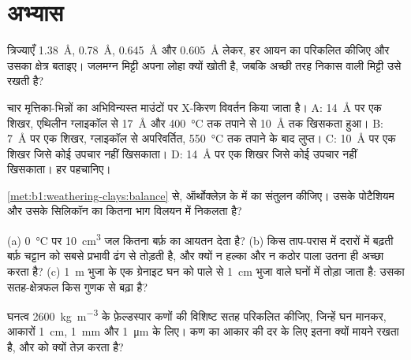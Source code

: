 \section{अभ्यास}

\begin{exercise}[$\star$]
\label{exo:b1:weathering-clays:1}
त्रिज्याएँ  \qty{1.38}{\angstrom},  \qty{0.78}{\angstrom},
 \qty{0.645}{\angstrom} और  \qty{0.605}{\angstrom} लेकर, हर आयन का  परिकलित कीजिए और उसका क्षेत्र बताइए। जलमग्न मिट्टी अपना लोहा क्यों खोती है, जबकि अच्छी तरह निकास वाली मिट्टी उसे रखती है?
\end{exercise}

\begin{exercise}[$\star$]
\label{exo:b1:weathering-clays:2}
चार मृत्तिका-भिन्नों का अभिविन्यस्त माउंटों पर X-किरण विवर्तन किया जाता है। A: \SI{14}{\angstrom} पर एक शिखर, एथिलीन ग्लाइकॉल से \SI{17}{\angstrom} और \SI{400}{\celsius} तक तपाने से \SI{10}{\angstrom} तक खिसकता हुआ। B: \SI{7}{\angstrom} पर एक शिखर, ग्लाइकॉल से अपरिवर्तित, \SI{550}{\celsius} तक तपाने के बाद लुप्त। C: \SI{10}{\angstrom} पर एक शिखर जिसे कोई उपचार नहीं खिसकाता। D: \SI{14}{\angstrom} पर एक शिखर जिसे कोई उपचार नहीं खिसकाता। हर  पहचानिए।
\end{exercise}

\begin{exercise}[$\star$]
\label{exo:b1:weathering-clays:3}
\cref{met:b1:weathering-clays:balance} से, ऑर्थोक्लेज़  के  में  का संतुलन कीजिए। उसके पोटैशियम और उसके सिलिकॉन का कितना भाग विलयन में निकलता है?
\end{exercise}

\begin{exercise}[$\star$]
\label{exo:b1:weathering-clays:4}
(a) \qty{0}{\celsius} पर \qty{10}{cm^3} जल कितना बर्फ़ का आयतन देता है? (b) किस ताप-परास में दरारों में बढ़ती बर्फ़ चट्टान को सबसे प्रभावी ढंग से तोड़ती है, और क्यों न हल्का और न कठोर पाला उतना ही अच्छा करता है? (c) \qty{1}{m} भुजा के एक ग्रेनाइट घन को पाले से \qty{1}{cm} भुजा वाले घनों में तोड़ा जाता है: उसका सतह-क्षेत्रफल किस गुणक से बढ़ा है?
\end{exercise}

\begin{exercise}[$\star\star$]
\label{exo:b1:weathering-clays:5}
घनत्व \qty{2600}{kg.m^{-3}} के फ़ेल्डस्पार कणों की विशिष्ट सतह परिकलित कीजिए, जिन्हें घन मानकर, आकारों \qty{1}{cm}, \qty{1}{mm} और \qty{1}{\micro m} के लिए। कण का आकार  की दर के लिए इतना क्यों मायने रखता है, और   को क्यों तेज़ करता है?
\end{exercise}

